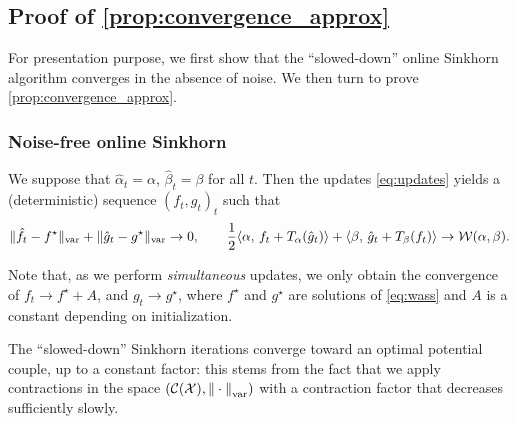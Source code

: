 \subsection{Proof of \autoref{prop:convergence_approx}}\label{sec:proof_convergence_approx}


For presentation purpose, we first show that the ``slowed-down'' online Sinkhorn algorithm converges in the absence of noise. We then turn to prove \autoref{prop:convergence_approx}.

\subsubsection{Noise-free online Sinkhorn}

\begin{proposition}\label{eq:deterministic}
    We suppose that $\hat \alpha_t = \alpha$, $\hat \beta_t = \beta$ for all
    $t$. Then the updates \eqref{eq:updates} yields a (deterministic) sequence $(f_t, g_t)_t$ such
    that 
    \begin{equation}
        \Vert \hat f_t - f^\star \Vert_{\text{var}} 
        + \Vert \hat g_t - g^\star \Vert_{\text{var}} \to 0,\qquad
        \frac{1}{2} \langle \alpha,\,f_t + T_{\alpha}(\hat g_t)\rangle + \langle \beta,\,\hat g_t + T_{\beta}(f_t)\rangle 
         \to \mathcal{W}(\alpha, \beta).
    \end{equation}
\end{proposition}
Note that, as we perform \textit{simultaneous} updates, we only obtain
the convergence of $f_t \to f^\star + A$, and $g_t \to g^\star$, where $f^\star$
and $g^\star$ are solutions of \eqref{eq:wass} and $A$ is a constant depending
on initialization.

The \enquote{slowed-down} Sinkhorn iterations converge toward an optimal
potential couple, up to a constant factor: this stems from the fact that we
apply contractions in the space $(\mathcal{C}(\mathcal{X}), {\Vert\cdot\Vert}_{\text{\upshape var}})$ with a
contraction factor that decreases sufficiently slowly.

